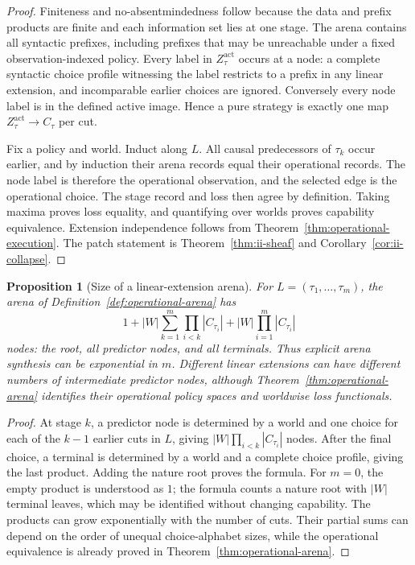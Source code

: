 \documentclass[11pt]{article}
\theoremstyle{plain}
\newtheorem{proposition}[theorem]{Proposition}
\theoremstyle{definition}
\theoremstyle{remark}
\begin{document}
\begin{proof}
Finiteness and no-absentmindedness follow because the data and prefix products
are finite and each information set lies at one stage. The arena contains all
syntactic prefixes, including prefixes that may be unreachable under a fixed
observation-indexed policy. Every label in $Z_\tau^{\mathrm{act}}$ occurs at a
node: a complete syntactic choice profile
witnessing the label restricts to a prefix in any linear extension, and
incomparable earlier choices are ignored. Conversely every node label is in the
defined active image. Hence a pure strategy is exactly one map
$Z_\tau^{\mathrm{act}}\to C_\tau$ per cut.

Fix a policy and world. Induct along $L$. All causal predecessors of
$\tau_k$ occur earlier, and by induction their arena records equal their
operational records. The node label is therefore the operational observation,
and the selected edge is the operational choice. The stage record and loss then
agree by definition. Taking maxima proves loss equality, and quantifying over
worlds proves capability equivalence. Extension independence follows from
Theorem~\ref{thm:operational-execution}. The patch statement is
Theorem~\ref{thm:ii-sheaf} and Corollary~\ref{cor:ii-collapse}.
\end{proof}


\begin{proposition}[Size of a linear-extension arena]
\label{prop:operational-arena-size}
For $L=(\tau_1,\ldots,\tau_m)$, the arena of
Definition~\ref{def:operational-arena} has
\[
1+|W|\sum_{k=1}^{m}\prod_{i<k}|C_{\tau_i}|
+|W|\prod_{i=1}^{m}|C_{\tau_i}|
\]
nodes: the root, all predictor nodes, and all terminals. Thus explicit arena
synthesis can be exponential in $m$. Different linear extensions can have
different numbers of intermediate predictor nodes, although
Theorem~\ref{thm:operational-arena} identifies their operational policy spaces
and worldwise loss functionals.
\end{proposition}

\begin{proof}
At stage $k$, a predictor node is determined by a world and one choice for each
of the $k-1$ earlier cuts in $L$, giving
$|W|\prod_{i<k}|C_{\tau_i}|$ nodes. After the final choice, a terminal is
determined by a world and a complete choice profile, giving the last product.
Adding the nature root proves the formula. For $m=0$, the empty product is
understood as $1$; the formula counts a nature root with $|W|$ terminal leaves,
which may be identified without changing capability. The products can grow
exponentially with the number of cuts. Their partial sums can depend on the
order of unequal choice-alphabet sizes, while the operational equivalence is
already proved in Theorem~\ref{thm:operational-arena}.
\end{proof}
\end{document}
